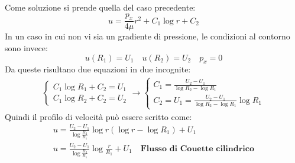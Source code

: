 %
Come soluzione si prende quella del caso precedente:
%
	\begin{equation*}
		u = \frac{p_x}{4 \mu} r^2 + C_1 \log{r} + C_2
	\end{equation*}	
%
In un caso in cui non vi sia un gradiente di pressione, le condizioni al contorno sono invece:
%
	\begin{equation*}
		u(R_1) = U_1 \quad u(R_2) = U_2 \quad p_x = 0
	\end{equation*}	
%
Da queste risultano due equazioni in due incognite:
%
	\begin{equation*}
		\begin{gathered}
			\left\{
				\begin{gathered}
					C_1 \log{R_1} + C_2 = U_1\\
					C_1 \log{R_2} + C_2 = U_2
				\end{gathered}
			\right.
			\rightarrow
			\left\{
				\begin{gathered}
					C_1 = \frac{U_2 - U_1}{\log{R_2} - \log{R_1}}\\
					C_2 = U_1 = \frac{U_2 - U_1}{\log{R_2} - \log{R_1}} \log{R_1}
				\end{gathered}
			\right.
		\end{gathered}
	\end{equation*}
%
Quindi il profilo di velocità può essere scritto come:
%
	\begin{equation*}
		\begin{gathered}
			u = \frac{U_2 - U_1}{\log{\frac{R_2}{R_1}}} \log{r} (\log{r} - \log{R_1}) + U_1\\
			u = \frac{U_2 - U_1}{\log{\frac{R_2}{R_1}}} \log{\frac{r}{R_1}} + U_1 \quad \textbf{Flusso di Couette cilindrico}
		\end{gathered}
	\end{equation*}
%

